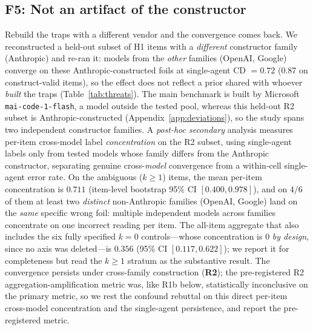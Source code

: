 \documentclass[acmsmall,screen,nonacm]{acmart}
\newcommand{\cd}{\textsf{CD}}
\begin{document}
\subsection{F5: Not an artifact of the constructor}
Rebuild the traps with a different vendor and the convergence comes back. We reconstructed a held-out subset
of H1 items with a \emph{different} constructor family (Anthropic) and re-ran it: models from the
\emph{other} families (OpenAI, Google) converge on these Anthropic-constructed foils at single-agent \cd{}
$=0.72$ (0.87 on construct-valid items), so the effect does not reflect a prior shared with whoever
\emph{built} the traps (Table~\ref{tab:threats}). The
main benchmark is built by Microsoft \texttt{mai-code-1-flash}, a model outside the tested pool, whereas this
held-out R2 subset is Anthropic-constructed (Appendix~\ref{app:deviations}), so the study spans two independent constructor
families. A
\emph{post-hoc secondary} analysis measures per-item
cross-model label \emph{concentration} on the R2 subset, using single-agent labels only from tested models
whose family differs from the Anthropic constructor, separating genuine cross-\emph{model} convergence from a
within-cell single-agent error rate. On the ambiguous ($k\ge1$) items, the mean per-item
concentration is $0.711$ (item-level bootstrap 95\% CI $[0.400,0.978]$), and on $4/6$ of them at least two
\emph{distinct} non-Anthropic families (OpenAI, Google) land on the \emph{same} specific wrong foil: multiple
independent models across families concentrate on one incorrect reading per item. The all-item aggregate that
also includes the six fully specified $k{=}0$ controls---whose concentration is $0$ \emph{by design}, since
no axis was deleted---is $0.356$ (95\% CI $[0.117,0.622]$); we report it for completeness but read the
$k\ge1$ stratum as the substantive result. The convergence persists under
cross-family construction (\textbf{R2}); the pre-registered R2 aggregation-amplification metric was, like
R1b below, statistically inconclusive on the primary metric, so we rest the confound rebuttal on this direct
per-item cross-model concentration and the single-agent persistence, and report the pre-registered metric.
\end{document}
